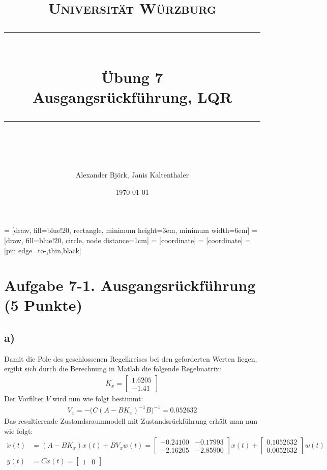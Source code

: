 \documentclass[11pt]{scrartcl} %
\title{	
	\normalfont\normalsize
	\textsc{Universität Würzburg}\\ %
	\vspace{25pt} %
	\rule{\linewidth}{0.5pt}\\ %
	\vspace{20pt} %
	{\huge Übung 7}\\ %
	{\Large Ausgangsrückführung, LQR}\\
	\vspace{12pt} %
	\rule{\linewidth}{2pt}\\ %
	\vspace{12pt} %
}
\author{\LARGE Alexander Björk, Janis Kaltenthaler} %
\date{\normalsize\today} %
\begin{document}
\maketitle %

 = [draw, fill=blue!20, rectangle, 
    minimum height=3em, minimum width=6em]
 = [draw, fill=blue!20, circle, node distance=1cm]
 = [coordinate]
 = [coordinate]
 = [pin edge={to-,thin,black}]
\newcommand{\inte}{$\displaystyle \int$}

\section*{Aufgabe 7-1. Ausgangsrückführung (5 Punkte)}
\subsection*{a)}
Damit die Pole des geschlossenen Regelkreises bei den geforderten Werten liegen, ergibt sich durch die Berechnung in Matlab die folgende Regelmatrix:
\begin{align*}
	K_x=\begin{bmatrix}1.6205\\-1.41\end{bmatrix}
\end{align*}
Der Vorfilter $V$ wird nun wie folgt bestimmt:
\begin{align*}
	V_x=-\bigl(C(A-BK_x)^{-1}B\bigr)^{-1}=0.052632
\end{align*}
Das resultierende Zustandsraummodell mit Zustandsrückführung erhält man nun wie folgt:
\begin{align*}
	\dot{x}(t)&=(A-BK_x)x(t)+BV_xw(t)=\begin{bmatrix}-0.24100&-0.17993\\-2.16205&-2.85900\end{bmatrix}x(t)+\begin{bmatrix}0.1052632\\0.0052632\end{bmatrix}w(t)\\
	y(t)&=Cx(t)=\begin{bmatrix}1&0\end{bmatrix}
\end{align*}
\end{document}
